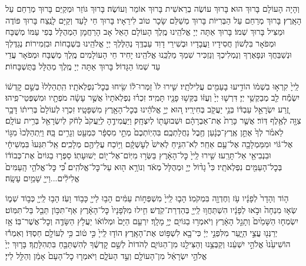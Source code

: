 \documentclass[twoside, openany, parskip=half, 11pt]{book}
\begin{document}
וְהָיָה הָעוֹלָם בָּרוּךְ הוּא׃
בָּרוּךְ עוֹשֶׂה בְרֵאשִׁית בָּרוּךְ אוֹמֵר וְעוֹשֶׂה׃
בָּרוּךְ גּוֹזֵר וּמְקַיֵּם בָּרוּךְ מְרַחֵם עַל הָאָֽרֶץ׃
בָּרוּךְ מְרַחֵם עַל הַבְּרִיּוֹת בָּרוּךְ מְשַׁלֵּם שָׂכָר טוֹב לִירֵאָיו׃
בָּרוּךְ חַי לָעַד וְקַיָּם לָנֶֽצַח בָּרוּךְ פּוֹדֶה וּמַצִּיל בָּרוּךְ שְׁמוֹ׃
בָּרוּךְ אַתָּה יְיָ אֱלֹהֵֽינוּ מֶֽלֶךְ הָעוֹלָם הָאֵל אָב הָרַחֲמָן הַמְהֻלָּל בְּפִי עַמּוֹ מְשֻׁבָּח וּמְפֹאָר בִּלְשׁוֹן חֲסִידָיו וַעֲבָדָיו וּבְשִׁירֵי דָוִד עַבְדֶּֽךָ נְהַלֶּלְךָ יְיָ אֱלֹהֵֽינוּ בִּשְׁבָחוֹת וּבִזְמִירוֹת׃ נְגַדֶּלְךָ וּנְשַׁבֵּחֲךָ וּנְפָאֶרְךָ וְנַמְלִיכְךָ וְנַזְכִּיר שִׁמְךָ מַלְכֵּֽנוּ אֱלֹהֵֽינוּ׃
יָחִיד חֵי הָעוֹלָמִים מֶֽלֶךְ מְשֻׁבָּח וּמְפֹאָר עֲדֵי עַד שְׁמוֹ הַגָּדוֹל׃ בָּרוּךְ אַתָּה יְיָ מֶֽלֶךְ מְהֻלָּל בַּתֻּשְׁבָּחוֹת׃

לַֽייָ֙ קִרְא֣וּ בִשְׁמ֔וֹ
הוֹדִ֥יעוּ בָעַמִּ֖ים עֲלִילֹתָֽיו׃
שִׁ֤ירוּ לוֹ֙ זַמְּרוּ־ל֔וֹ שִׂ֖יחוּ בְּכׇל־נִפְלְאֹתָֽיו׃
הִֽתְהַלְלוּ֙ בְּשֵׁ֣ם קׇדְשׁ֔וֹ יִשְׂמַ֕ח לֵ֖ב מְבַקְשֵׁ֥י יְיָ׃
דִּרְשׁ֤וּ יְיָ֙ וְעֻזּ֔וֹ בַּקְּשׁ֥וּ פָנָ֖יו תָּמִֽיד׃
זִכְר֗וּ נִפְלְאֹתָיו֙ אֲשֶׁ֣ר עָשָׂ֔ה מֹפְתָ֖יו וּמִשְׁפְּטֵי־פִֽיהוּ׃
זֶ֚רַע יִשְׂרָאֵ֣ל עַבְדּ֔וֹ בְּנֵ֥י יַעֲקֹ֖ב בְּחִירָֽיו׃
ה֚וּא יְיָ֣ אֱלֹהֵ֔ינוּ בְּכׇל־הָאָ֖רֶץ מִשְׁפָּטָֽיו׃
זִכְר֤וּ לְעוֹלָם֙ בְּרִית֔וֹ דָּבָ֥ר צִוָּ֖ה לְאֶ֥לֶף דּֽוֹר׃
אֲשֶׁ֤ר כָּרַת֙ אֶת־אַבְרָהָ֔ם וּשְׁבוּעָת֖וֹ לְיִצְחָֽק׃
וַיַּעֲמִידֶ֤הָ לְיַֽעֲקֹב֙ לְחֹ֔ק לְיִשְׂרָאֵ֖ל בְּרִ֥ית עוֹלָֽם׃
לֵאמֹ֗ר לְךָ֙ אֶתֵּ֣ן אֶֽרֶץ־כְּנָ֔עַן חֶ֖בֶל נַחֲלַתְכֶֽם׃
בִּהְיֽוֹתְכֶם֙ מְתֵ֣י מִסְפָּ֔ר כִּמְעַ֖ט וְגָרִ֥ים בָּֽהּ׃
וַיִּֽתְהַלְּכוּ֙ מִגּ֣וֹי אֶל־גּ֔וֹי וּמִמַּמְלָכָ֖ה אֶל־עַ֥ם אַחֵֽר׃
לֹֽא־הִנִּ֤יחַ לְאִישׁ֙ לְעׇשְׁקָ֔ם וַיּ֥וֹכַח עֲלֵיהֶ֖ם מְלָכִֽים׃
אַֽל־תִּגְּעוּ֙ בִּמְשִׁיחָ֔י וּבִנְבִיאַ֖י אַל־תָּרֵֽעוּ׃
שִׁ֤ירוּ לַֽייָ֙ כׇּל־הָאָ֔רֶץ בַּשְּׂר֥וּ מִיּֽוֹם־אֶל־י֖וֹם יְשׁוּעָתֽוֹ׃
סַפְּר֤וּ בַגּוֹיִם֙ אֶת־כְּבוֹד֔וֹ בְּכׇל־הָעַמִּ֖ים נִפְלְאֹתָֽיו׃
כִּי֩ גָד֨וֹל יְיָ֤ וּמְהֻלָּל֙ מְאֹ֔ד וְנוֹרָ֥א ה֖וּא עַל־כׇּל־אֱלֹהִֽים׃
כִּ֠י כׇּל־אֱלֹהֵ֤י הָֽעַמִּים֙ אֱלִילִ֔ים...וַייָ֖ שָׁמַ֥יִם עָשָֽׂה׃

ה֤וֹד וְהָדָר֙ לְפָנָ֔יו עֹ֥ז וְחֶדְוָ֖ה בִּמְקֹמֽוֹ׃
הָב֤וּ לַֽייָ֙ מִשְׁפְּח֣וֹת עַמִּ֔ים הָב֥וּ לַייָ֖ כָּב֥וֹד וָעֹֽז׃
הָב֥וּ לַֽייָ֖ כְּב֣וֹד שְׁמ֑וֹ שְׂא֤וּ מִנְחָה֙ וּבֹ֣אוּ לְפָנָ֔יו
הִשְׁתַּחֲו֥וּ לַֽייָ֖ בְּהַדְרַת־קֹֽדֶשׁ׃ חִ֤ילוּ מִלְּפָנָיו֙ כׇּל־הָאָ֔רֶץ
אַף־תִּכּ֥וֹן תֵּבֵ֖ל בַּל־תִּמּֽוֹט׃ יִשְׂמְח֤וּ הַשָּׁמַ֙יִם֙ וְתָגֵ֣ל הָאָ֔רֶץ
וְיֹאמְר֥וּ בַגּוֹיִ֖ם יְיָ֥ מָלָֽךְ׃ יִרְעַ֤ם הַיָּם֙ וּמְלוֹא֔וֹ
יַעֲלֹ֥ץ הַשָּׂדֶ֖ה וְכׇל־אֲשֶׁר־בּֽוֹ׃ אָ֥ז יְרַנְּנ֖וּ עֲצֵ֣י הַיָּ֑עַר
מִלִּפְנֵ֣י יְיָ֔ כִּי־בָ֖א לִשְׁפּ֥וֹט אֶת־הָאָֽרֶץ׃ הוֹד֤וּ לַֽייָ֙ כִּ֣י ט֔וֹב
כִּ֥י לְעוֹלָ֖ם חַסְדּֽוֹ׃ וְאִמְר֕וּ הוֹשִׁיעֵ֙נוּ֙ אֱלֹהֵ֣י יִשְׁעֵ֔נוּ
וְקַבְּצֵ֥נוּ וְהַצִּילֵ֖נוּ מִן־הַגּוֹיִ֑ם לְהֹדוֹת֙ לְשֵׁ֣ם קׇדְשֶׁ֔ךָ
לְהִשְׁתַּבֵּ֖חַ בִּתְהִלָּתֶֽךָ׃ בָּר֤וּךְ יְיָ֙ אֱלֹהֵ֣י יִשְׂרָאֵ֔ל
מִן־הָעוֹלָ֖ם וְעַ֣ד הָעֹלָ֑ם וַיֹּאמְר֤וּ כׇל־הָעָם֙ אָמֵ֔ן וְהַלֵּ֖ל לַייָ׃\\
\end{document}
